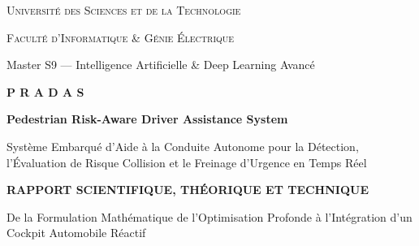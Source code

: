 \documentclass[11pt,a4paper]{article}
\begin{document}
\begin{titlepage}
    \centering
    \vspace*{0.5cm}
    
    {\scshape\LARGE Université des Sciences et de la Technologie\par}
    {\scshape\Large Faculté d'Informatique \& Génie Électrique\par}
    {\large Master S9 — Intelligence Artificielle \& Deep Learning Avancé\par}
    \vspace{1.5cm}
    
    \begin{tcolorbox}[colback=pradasdark, colframe=pradascyan, arc=3mm, width=0.95\textwidth, halign=center]
        \vspace{0.4cm}
        {\Huge \bfseries \color{white} P R A D A S \par}
        \vspace{0.3cm}
        {\Large \bfseries \color{pradascyan} Pedestrian Risk-Aware Driver Assistance System \par}
        \vspace{0.2cm}
        {\color{gray!30} \small Système Embarqué d'Aide à la Conduite Autonome pour la Détection, l'Évaluation de Risque Collision et le Freinage d'Urgence en Temps Réel}
        \vspace{0.4cm}
    \end{tcolorbox}
    
    \vspace{1.2cm}
    
    \textbf{\Large RAPPORT SCIENTIFIQUE, THÉORIQUE ET TECHNIQUE}\par
    \vspace{0.3cm}
    {\large De la Formulation Mathématique de l'Optimisation Profonde à l'Intégration d'un Cockpit Automobile Réactif}
    
    \vspace{2cm}
    

\end{titlepage}
\end{document}
